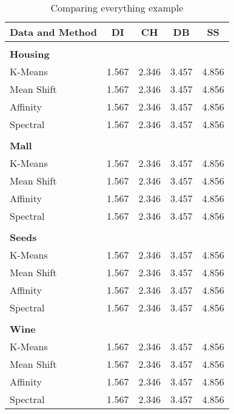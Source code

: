 \begin{table}[H]
\begin{center}
\begin{tabular}{lrrrr}
Data and Method & \multicolumn{1}{c}{\gls{DI}} & \multicolumn{1}{c}{\gls{CH}} & \multicolumn{1}{c}{\gls{DB}} & \multicolumn{1}{c}{\gls{SS}} \\ \hline
 &  &  &  &  \\
\textbf{Housing} &  &  &  & \\
K-Means & 1.567 & 2.346 & 3.457 & 4.856 \\
Mean Shift & 1.567 & 2.346 & 3.457 & 4.856 \\
Affinity & 1.567 & 2.346 & 3.457 & 4.856 \\
Spectral & 1.567 & 2.346 & 3.457 & 4.856 \\
 &  &  &  &  \\
\textbf{Mall} &  &  &  &  \\
K-Means & 1.567 & 2.346 & 3.457 & 4.856 \\
Mean Shift & 1.567 & 2.346 & 3.457 & 4.856 \\
Affinity & 1.567 & 2.346 & 3.457 & 4.856 \\
Spectral & 1.567 & 2.346 & 3.457 & 4.856 \\
 &  &  &  &  \\
\textbf{Seeds} &  &  &  &  \\
K-Means & 1.567 & 2.346 & 3.457 & 4.856 \\
Mean Shift & 1.567 & 2.346 & 3.457 & 4.856 \\
Affinity & 1.567 & 2.346 & 3.457 & 4.856 \\
Spectral & 1.567 & 2.346 & 3.457 & 4.856 \\
 &  &  &  &  \\
\textbf{Wine} &  &  &  &  \\
K-Means & 1.567 & 2.346 & 3.457 & 4.856 \\
Mean Shift & 1.567 & 2.346 & 3.457 & 4.856 \\
Affinity & 1.567 & 2.346 & 3.457 & 4.856 \\
Spectral & 1.567 & 2.346 & 3.457 & 4.856
\end{tabular}%
\end{center}
\caption{Comparing everything example}
\label{tab:evalutaion_table}
\end{table}

